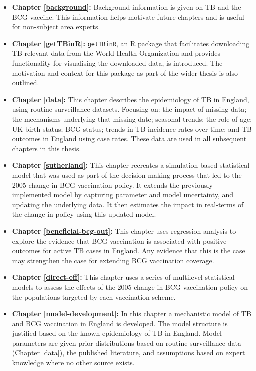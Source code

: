 \documentclass[11pt,twoside]{bristolthesis}
\begin{document}
  \begin{itemize}
  \item
    \textbf{Chapter \ref{background}:} Background information is given on TB and the BCG vaccine. This information helps motivate future chapters and is useful for non-subject area experts.
  \item
    \textbf{Chapter \ref{getTBinR}:} \texttt{getTBinR}, an R package that facilitates downloading TB relevant data from the World Health Organization and provides functionality for visualising the downloaded data, is introduced. The motivation and context for this package as part of the wider thesis is also outlined.
  \item
    \textbf{Chapter \ref{data}:} This chapter describes the epidemiology of TB in England, using routine surveillance datasets. Focusing on: the impact of missing data; the mechanisms underlying that missing date; seasonal trends; the role of age; UK birth status; BCG status; trends in TB incidence rates over time; and TB outcomes in England using case rates. These data are used in all subsequent chapters in this thesis.
  \item
    \textbf{Chapter \ref{sutherland}:} This chapter recreates a simulation based statistical model that was used as part of the decision making process that led to the 2005 change in BCG vaccination policy. It extends the previously implemented model by capturing parameter and model uncertainty, and updating the underlying data. It then estimates the impact in real-terms of the change in policy using this updated model.
  \item
    \textbf{Chapter \ref{beneficial-bcg-out}:} This chapter uses regression analysis to explore the evidence that BCG vaccination is associated with positive outcomes for active TB cases in England. Any evidence that this is the case may strengthen the case for extending BCG vaccination coverage.
  \item
    \textbf{Chapter \ref{direct-eff}:} This chapter uses a series of multilevel statistical models to assess the effects of the 2005 change in BCG vaccination policy on the populations targeted by each vaccination scheme.
  \item
    \textbf{Chapter \ref{model-development}:} In this chapter a mechanistic model of TB and BCG vaccination in England is developed. The model structure is justified based on the known epidemiology of TB in England. Model parameters are given prior distributions based on routine surveillance data (Chapter \ref{data}), the published literature, and assumptions based on expert knowledge where no other source exists.

\end{itemize}
\end{document}
